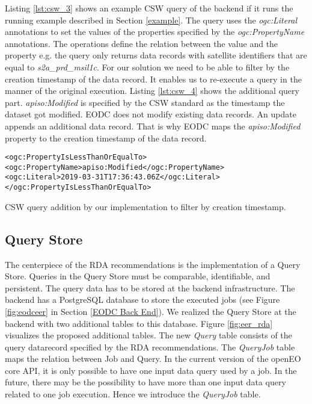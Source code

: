 \documentclass[draft,final]{vutinfth} %
\newenvironment{code}{\captionsetup{type=listing}}{}
\newcommand{\bgoesswein}[1]{#1}
\begin{document}
\bgoesswein{
Listing \ref{lst:csw_3} shows an example CSW query of the backend if it runs the running example described in Section \ref{example}. The query uses the \textit{ogc:Literal} annotations to set the values of the properties specified by the \textit{ogc:PropertyName} annotations. The operations define the relation between the value and the property e.g. the query only returns data records with satellite identifiers that are equal to \textit{s2a\_prd\_msil1c}. For our solution we need to be able to filter by the creation timestamp of the data record. It enables us to re-execute a query in the manner of the original execution. Listing \ref{lst:csw_4} shows the additional query part. \textit{apiso:Modified} is specified by the CSW standard as the timestamp the dataset got modified. EODC does not modify existing data records. An update appends an additional data record. That is why EODC maps the \textit{apiso:Modified} property to the creation timestamp of the data record.   
}

\begin{code}
	\begin{verbatim}
<ogc:PropertyIsLessThanOrEqualTo>
<ogc:PropertyName>apiso:Modified</ogc:PropertyName>
<ogc:Literal>2019-03-31T17:36:43.06Z</ogc:Literal>
</ogc:PropertyIsLessThanOrEqualTo>
	\end{verbatim}
	\caption{CSW query addition by our implementation to filter by creation timestamp.}
	\label{lst:csw_4}
\end{code} 




\subsection{Query Store}
The centerpiece of the RDA recommendations is the implementation of a Query Store. Queries in the Query Store must be comparable, identifiable, and persistent. The query data has to be stored at the backend infrastructure. The backend has a PostgreSQL database to store the executed jobs (see Figure \ref{fig:eodceer} in Section \ref{EODC Back End}). We realized the Query Store at the backend with two additional tables to this database. Figure \ref{fig:eer_rda} visualizes the proposed additional tables. The new \textit{Query} table consists of the query datarecord specified by the RDA recommendations. The \textit{QueryJob} table maps the relation between Job and Query. In the current version of the openEO core API, it is only possible to have one input data query used by a job. In the future, there may be the possibility to have more than one input data query related to one job execution. Hence we introduce the \textit{QueryJob} table. 
\end{document}
